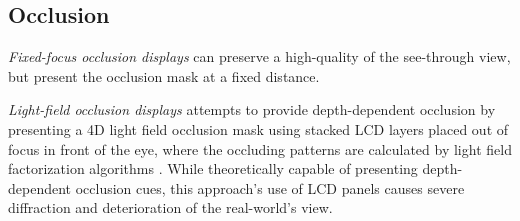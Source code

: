 \subsection{Occlusion}

\emph{Fixed-focus occlusion displays} \cite{Kiyokawa2000,Kiyokawa2001,Kiyokawa2003} can preserve a high-quality of the see-through view, but present the occlusion mask at a fixed distance. 

\emph{Light-field occlusion displays} \cite{maimone2013general} attempts to provide depth-dependent occlusion by presenting a 4D light field occlusion mask using stacked LCD layers placed out of focus in front of the eye, where the occluding patterns are calculated by light field factorization algorithms \cite{Lanman2010,Wetzstein2012}. 
While theoretically capable of presenting depth-dependent occlusion cues, this approach’s use of LCD panels causes severe diffraction and deterioration of the real-world’s view. 

